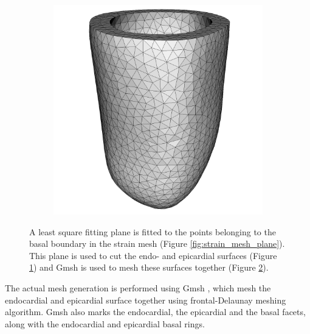 \begin{figure}[htbp]
\begin{subfigure}[t]{0.36\textwidth}
    \caption{\label{fig:cut_intro}}
  \end{subfigure}
  \begin{subfigure}[t]{0.32\textwidth}
    \includegraphics[width=\textwidth]{chapters/introduction/figures/geometry/mesh.png}
    \caption{\label{fig:mesh_intro}}
  \end{subfigure}
\caption{A least square fitting plane is fitted to the points
  belonging to the basal boundary in the strain mesh (Figure
  \ref{fig:strain_mesh_plane}). This plane is used to cut the endo- and
  epicardial surfaces (Figure \ref{fig:cut_intro}) and Gmsh is used to mesh
  these surfaces together (Figure \ref{fig:mesh_intro}). }
\label{fig:mesh_generation_intro}
\end{figure}



The actual mesh generation is performed using Gmsh
\cite{geuzaine2009gmsh}, which mesh the endocardial and epicardial
surface together using frontal-Delaunay meshing algorithm. Gmsh also marks
the endocardial, the epicardial  and the basal facets, along with the
endocardial and epicardial basal rings. 

  



